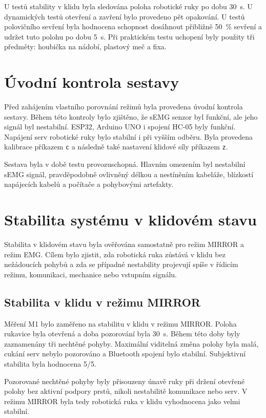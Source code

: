 U testů stability v klidu byla sledována poloha robotické ruky po dobu 30~s. U dynamických testů otevření a zavření bylo provedeno pět opakování. U testů polovičního sevření byla hodnocena schopnost dosáhnout přibližně 50~\% sevření a udržet tuto polohu po dobu 5~s. Při praktickém testu uchopení byly použity tři předměty: houbička na nádobí, plastový meč a fixa.

\section{Úvodní kontrola sestavy}
\label{sec:uvodni-kontrola}

Před zahájením vlastního porovnání režimů byla provedena úvodní kontrola sestavy. Během této kontroly bylo zjištěno, že sEMG senzor byl funkční, ale jeho signál byl nestabilní. ESP32, Arduino UNO i spojení HC-05 byly funkční. Napájení serv robotické ruky bylo stabilní i při vyšším odběru. Byla provedena kalibrace příkazem \texttt{c} a následně také nastavení klidové síly příkazem \texttt{z}.

Sestava byla v době testu provozuschopná. Hlavním omezením byl nestabilní sEMG signál, pravděpodobně ovlivněný délkou a nestíněním kabeláže, blízkostí napájecích kabelů a počítače a pohybovými artefakty.

\section{Stabilita systému v klidovém stavu}
\label{sec:stabilita-klid}

Stabilita v klidovém stavu byla ověřována samostatně pro režim MIRROR a režim EMG\@. Cílem bylo zjistit, zda robotická ruka zůstává v klidu bez nežádoucích pohybů a zda se případné nestability projevují spíše v řídicím režimu, komunikaci, mechanice nebo vstupním signálu.

\subsection{Stabilita v klidu v režimu MIRROR}
\label{subsec:klid-mirror}

Měření M1 bylo zaměřeno na stabilitu v klidu v režimu MIRROR\@. Poloha rukavice byla otevřená a doba pozorování byla 30~s. Během této doby byly zaznamenány tři nechtěné pohyby. Maximální viditelná změna polohy byla malá, cukání serv nebylo pozorováno a Bluetooth spojení bylo stabilní. Subjektivní stabilita byla hodnocena 5/5.

Pozorované nechtěné pohyby byly přisouzeny únavě ruky při držení otevřené polohy bez aktivní podpory prstů, nikoli nestabilitě komunikace nebo serv. V režimu MIRROR byla tedy robotická ruka v klidu vyhodnocena jako velmi stabilní.

